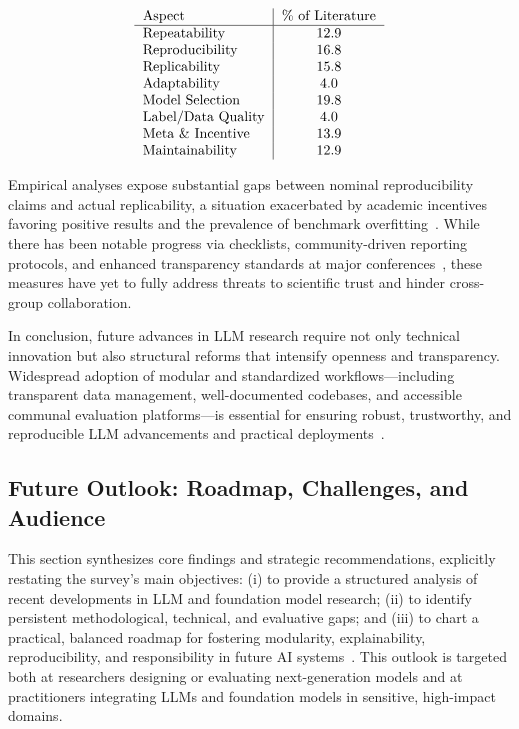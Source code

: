 \documentclass[sigconf]{acmart}
\begin{document}
\[
\begin{tabular}{l|c}
Aspect & \% of Literature \\
\hline
Repeatability & 12.9 \\
Reproducibility & 16.8 \\
Replicability & 15.8 \\
Adaptability & 4.0 \\
Model Selection & 19.8 \\
Label/Data Quality & 4.0 \\
Meta \& Incentive & 13.9 \\
Maintainability & 12.9 \\
\end{tabular}
\]

Empirical analyses expose substantial gaps between nominal reproducibility claims and actual replicability, a situation exacerbated by academic incentives favoring positive results and the prevalence of benchmark overfitting~\cite{ref61,ref79,ref82,ref85,ref87,ref91}. While there has been notable progress via checklists, community-driven reporting protocols, and enhanced transparency standards at major conferences~\cite{ref33,ref81,ref83,ref84}, these measures have yet to fully address threats to scientific trust and hinder cross-group collaboration.

In conclusion, future advances in LLM research require not only technical innovation but also structural reforms that intensify openness and transparency. Widespread adoption of modular and standardized workflows—including transparent data management, well-documented codebases, and accessible communal evaluation platforms—is essential for ensuring robust, trustworthy, and reproducible LLM advancements and practical deployments~\cite{ref81,ref82,ref83,ref86,ref91}.

\subsection{Future Outlook: Roadmap, Challenges, and Audience}

This section synthesizes core findings and strategic recommendations, explicitly restating the survey's main objectives: (i) to provide a structured analysis of recent developments in LLM and foundation model research; (ii) to identify persistent methodological, technical, and evaluative gaps; and (iii) to chart a practical, balanced roadmap for fostering modularity, explainability, reproducibility, and responsibility in future AI systems~\cite{ref91,ref92,ref93,ref94,ref95,ref96,ref97,ref98,ref99,ref100,ref101,ref102,ref103,ref104,ref105,ref106,ref107,ref108}. This outlook is targeted both at researchers designing or evaluating next-generation models and at practitioners integrating LLMs and foundation models in sensitive, high-impact domains.
\end{document}
